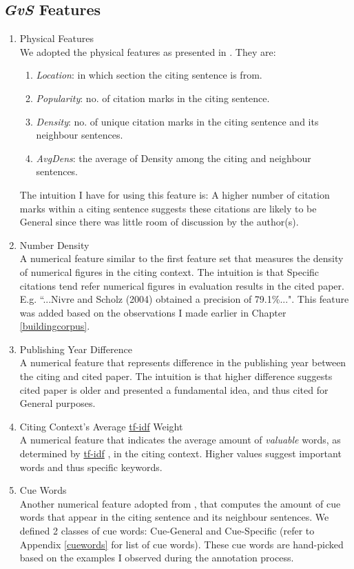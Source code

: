 \subsection*{{\it GvS} Features}
\begin{enumerate}
\item Physical Features \\
We adopted the physical features as presented in \cite{dongensemble}. They are:
\begin{enumerate}
\item \textit{Location}: in which section the citing sentence is from.
\item \textit{Popularity}: no. of citation marks in the citing sentence.
\item \textit{Density}: no. of unique citation marks in the citing sentence and its neighbour sentences.
\item \textit{AvgDens}: the average of Density among the citing and neighbour sentences.
\end{enumerate}
The intuition I have for using this feature is: A higher number of citation marks within a citing sentence suggests these citations are likely to be General since there was little room of discussion by the author(s).

\item Number Density \\
A numerical feature similar to the first feature set that measures the density of numerical figures in the citing context. The intuition is that Specific citations tend refer numerical figures in evaluation results in the cited paper. E.g. ``...Nivre and Scholz (2004) obtained a precision of 79.1\%...". This feature was added based on the observations I made earlier in Chapter \ref{buildingcorpus}.

\item Publishing Year Difference \\
A numerical feature that represents difference in the publishing year between the citing and cited paper. The intuition is that higher difference suggests cited paper is older and presented a fundamental idea, and thus cited for General purposes.

\item Citing Context's Average \url{tf-idf} Weight \\
A numerical feature that indicates the average amount of \textit{valuable} words, as determined by \url{tf-idf} \cite{irtextbook},  in the citing context. Higher values suggest important words and thus specific keywords.

\item Cue Words \\
Another numerical feature adopted from \cite{dongensemble}, that computes the amount of cue words that appear in the citing sentence and its neighbour sentences. We defined 2 classes of cue words: Cue-General and Cue-Specific (refer to Appendix \ref{cuewords} for list of cue words). These cue words are hand-picked based on the examples I observed during the annotation process.
\end{enumerate}

